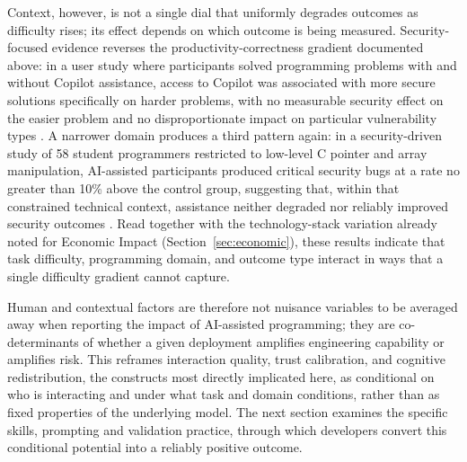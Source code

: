 Context, however, is not a single dial that uniformly degrades outcomes as difficulty rises; its effect depends on which outcome is being measured. Security-focused evidence reverses the productivity-correctness gradient documented above: in a user study where participants solved programming problems with and without Copilot assistance, access to Copilot was associated with more secure solutions specifically on harder problems, with no measurable security effect on the easier problem and no disproportionate impact on particular vulnerability types \cite{asare_user-centered_2024}. A narrower domain produces a third pattern again: in a security-driven study of 58 student programmers restricted to low-level C pointer and array manipulation, AI-assisted participants produced critical security bugs at a rate no greater than 10\% above the control group, suggesting that, within that constrained technical context, assistance neither degraded nor reliably improved security outcomes \cite{sandoval_lost_2022}. Read together with the technology-stack variation already noted for Economic Impact (Section~\ref{sec:economic}), these results indicate that task difficulty, programming domain, and outcome type interact in ways that a single difficulty gradient cannot capture.

Human and contextual factors are therefore not nuisance variables to be averaged away when reporting the impact of AI-assisted programming; they are co-determinants of whether a given deployment amplifies engineering capability or amplifies risk. This reframes interaction quality, trust calibration, and cognitive redistribution, the constructs most directly implicated here, as conditional on who is interacting and under what task and domain conditions, rather than as fixed properties of the underlying model. The next section examines the specific skills, prompting and validation practice, through which developers convert this conditional potential into a reliably positive outcome.


